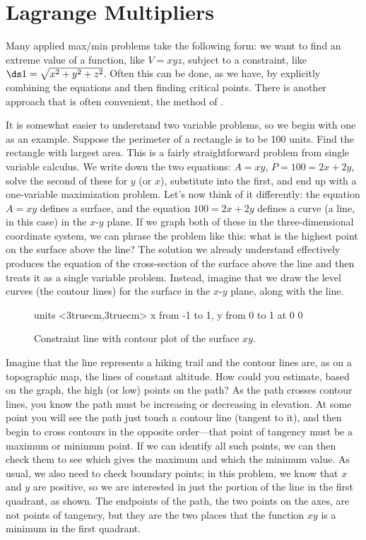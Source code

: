 \section{Lagrange Multipliers}\label{sec:LagrangeMultipliers}

Many applied max/min problems take the following form:
we want to find an extreme value of a function, like $V=xyz$, subject
to a constraint, like $\ds1=\sqrt{x^2+y^2+z^2}$. Often this can be
done, as we have, by explicitly combining the equations and then
finding critical points. There is another approach that is often
convenient, the method of .

It is somewhat easier to understand two variable problems, so we begin
with one as an example. Suppose the perimeter of a rectangle is to be
100 units. Find the rectangle with largest area. This is a fairly
straightforward problem from single variable calculus. We write down
the two equations: $A=xy$, $P=100=2x+2y$, solve the second of these
for $y$ (or $x$), substitute into the first, and end up with a
one-variable maximization problem. Let's now think of it differently:
the equation $A=xy$ defines a surface, and the equation $100=2x+2y$
defines a curve (a line, in this case) in the $x$-$y$ plane. If we
graph both of these in the three-dimensional coordinate system, we can
phrase the problem like this: what is the highest point on the surface
above the line? The solution we already understand effectively
produces the equation of the cross-section of the surface above the
line and then treats it as a single variable problem. Instead, imagine
that we draw the level curves (the contour lines) for the surface in
the $x$-$y$ plane, along with the line.

\begin{figure}[H]
\centerline{
\vbox{\beginpicture
\normalgraphs
\setcoordinatesystem units <3truecm,3truecm>
\setplotarea x from -1 to 1, y from 0 to 1
 at 0 0
\endpicture}}
\caption{Constraint line with contour plot of the surface $xy$.}
\label{fig:lagrange}
\end{figure}

Imagine that the line represents a hiking trail and the contour lines
are, as on a topographic map, the lines of constant altitude. How
could you estimate, based on the graph, the high (or low) points on
the path? As the path crosses contour lines, you know the path must be
increasing or decreasing in elevation. At some point you will see the
path just touch a contour line (tangent to it), and then begin to
cross contours in the opposite order---that point of tangency must be
a maximum or minimum point. If we can identify all such points, we can
then check them to see which gives the maximum and which the minimum
value. As usual, we also need to check boundary points; in this
problem, we know that $x$ and $y$ are positive, so we are interested
in just the portion of the line in the first quadrant, as shown. The
endpoints of the path, the two points on the axes, are not points of
tangency, but they are the two places that the function $xy$ is a
minimum in the first quadrant.

